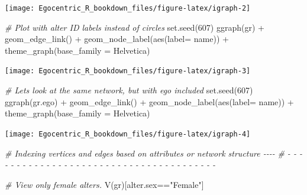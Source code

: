 \documentclass[
]{book}
\newenvironment{Shaded}{\begin{snugshade}}{\end{snugshade}}
\newcommand{\AttributeTok}[1]{\textcolor[rgb]{0.77,0.63,0.00}{#1}}
\newcommand{\CommentTok}[1]{\textcolor[rgb]{0.56,0.35,0.01}{\textit{#1}}}
\newcommand{\DecValTok}[1]{\textcolor[rgb]{0.00,0.00,0.81}{#1}}
\newcommand{\FunctionTok}[1]{\textcolor[rgb]{0.00,0.00,0.00}{#1}}
\newcommand{\NormalTok}[1]{#1}
\newcommand{\SpecialCharTok}[1]{\textcolor[rgb]{0.00,0.00,0.00}{#1}}
\newcommand{\StringTok}[1]{\textcolor[rgb]{0.31,0.60,0.02}{#1}}
\begin{document}
\begin{center}\texttt{[image: Egocentric\_R\_bookdown\_files/figure-latex/igraph-2]} \end{center}

\begin{Shaded}
\begin{Highlighting}[]
\CommentTok{\# Plot with alter ID labels instead of circles}
\FunctionTok{set.seed}\NormalTok{(}\DecValTok{607}\NormalTok{)}
\FunctionTok{ggraph}\NormalTok{(gr) }\SpecialCharTok{+} 
  \FunctionTok{geom\_edge\_link}\NormalTok{() }\SpecialCharTok{+}
  \FunctionTok{geom\_node\_label}\NormalTok{(}\FunctionTok{aes}\NormalTok{(}\AttributeTok{label=}\NormalTok{ name)) }\SpecialCharTok{+} 
  \FunctionTok{theme\_graph}\NormalTok{(}\AttributeTok{base\_family =} \StringTok{\textquotesingle{}Helvetica\textquotesingle{}}\NormalTok{)}
\end{Highlighting}
\end{Shaded}

\begin{center}\texttt{[image: Egocentric\_R\_bookdown\_files/figure-latex/igraph-3]} \end{center}

\begin{Shaded}
\begin{Highlighting}[]
\CommentTok{\# Let\textquotesingle{}s look at the same network, but with ego included}
\FunctionTok{set.seed}\NormalTok{(}\DecValTok{607}\NormalTok{)}
\FunctionTok{ggraph}\NormalTok{(gr.ego) }\SpecialCharTok{+} 
  \FunctionTok{geom\_edge\_link}\NormalTok{() }\SpecialCharTok{+}
  \FunctionTok{geom\_node\_label}\NormalTok{(}\FunctionTok{aes}\NormalTok{(}\AttributeTok{label=}\NormalTok{ name)) }\SpecialCharTok{+} 
  \FunctionTok{theme\_graph}\NormalTok{(}\AttributeTok{base\_family =} \StringTok{\textquotesingle{}Helvetica\textquotesingle{}}\NormalTok{)}
\end{Highlighting}
\end{Shaded}

\begin{center}\texttt{[image: Egocentric\_R\_bookdown\_files/figure-latex/igraph-4]} \end{center}

\begin{Shaded}
\begin{Highlighting}[]
\CommentTok{\# Indexing vertices and edges based on attributes or network structure      {-}{-}{-}{-}}
\CommentTok{\# {-} {-} {-} {-} {-} {-} {-} {-} {-} {-} {-} {-} {-} {-} {-} {-} {-} {-} {-} {-} {-} {-} {-} {-} {-} {-} {-} {-} {-} {-} {-} {-} {-} {-} {-} {-} {-} {-} {-} }

\CommentTok{\# View only female alters.}
\FunctionTok{V}\NormalTok{(gr)[alter.sex}\SpecialCharTok{==}\StringTok{"Female"}\NormalTok{]}
\end{Highlighting}
\end{Shaded}
\end{document}
